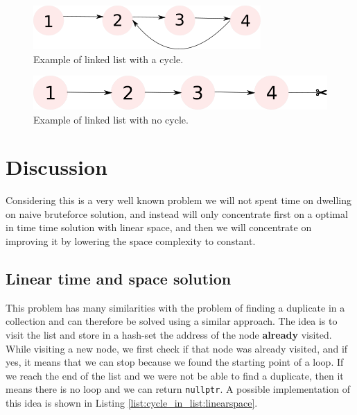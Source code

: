 \begin{figure}
	\label{fig:cycle_in_list:example1}
	\centering
	\includegraphics[scale=1.0]{sources/cycle_in_list/images/example1}
	\caption{Example of linked list with a cycle.}
\end{figure}
\begin{figure}
	\label{fig:cycle_in_list:example2}
	\centering
	\includegraphics[scale=1.0]{sources/cycle_in_list/images/example2}
	\caption{Example of linked list with no cycle.}
\end{figure}

%
%	

\section{Discussion}
\label{cycle_in_list:sec:discussion}
Considering this is a very well known problem we will not spent time on dwelling on naive bruteforce solution, and instead will only concentrate first on a optimal in time time solution with linear space, and then we will concentrate on improving it by lowering the space complexity to constant.

\subsection{Linear time and space solution}
\label{cycle_in_list:sec:bruteforce}
This problem has many similarities with the problem of finding a duplicate in a collection and can therefore be solved using a similar approach. The idea is to visit the list and store in a hash-set the  address of the node \textbf{already} visited. While visiting a new node, we first check if that node was already visited, and if yes, it means that we can stop because we found the starting point of a loop. If we reach the end of the list and we were not be able to find a duplicate, then it means there is no loop and we can return \lstinline[columns=fixed]{nullptr}.
A possible implementation of this idea is shown in Listing \ref{list:cycle_in_list:linearspace}.

